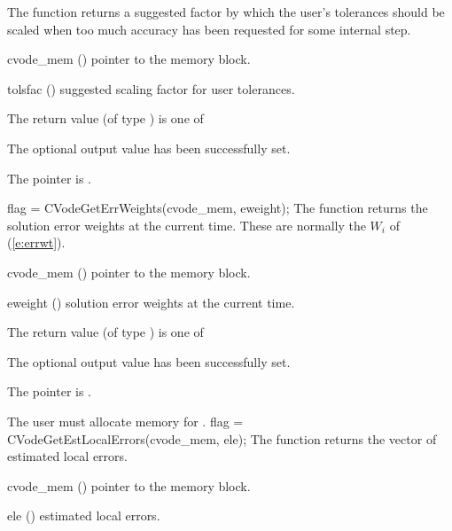{
  The function  returns a
  suggested factor by which the user's tolerances 
  should be scaled when too much accuracy has been 
  requested for some internal step.
}
{
  \begin{args}
  \item[cvode\_mem] ()
    pointer to the {\cvode} memory block.
  \item[tolsfac] ()
    suggested scaling factor for user tolerances.
  \end{args}
}
{
  The return value  (of type ) is one of
  \begin{args}
  \item[\Id{CV\_SUCCESS}] 
    The optional output value has been successfully set.
  \item[\Id{CV\_MEM\_NULL}]
    The  pointer is .
  \end{args}
}
{}
{
  flag = CVodeGetErrWeights(cvode\_mem, eweight);
}
{
  The function  returns the solution error weights 
  at the current time. These are normally the $W_i$ of (\ref{e:errwt}).
}
{
  \begin{args}
  \item[cvode\_mem] ()
    pointer to the {\cvode} memory block.
  \item[eweight] ()
    solution error weights at the current time.
  \end{args}
}
{
  The return value  (of type ) is one of
  \begin{args}
  \item[\Id{CV\_SUCCESS}] 
    The optional output value has been successfully set.
  \item[\Id{CV\_MEM\_NULL}]
    The  pointer is .
  \end{args}
}
{
  {\warn} The user must allocate memory for .
}
{
  flag = CVodeGetEstLocalErrors(cvode\_mem, ele);
}
{
  The function  returns the
  vector of estimated local errors.
}
{
  \begin{args}
  \item[cvode\_mem] ()
    pointer to the {\cvode} memory block.
  \item[ele] ()
    estimated local errors.
  \end{args}
}

